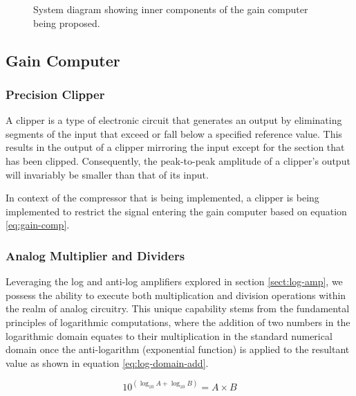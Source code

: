 \documentclass[10pt]{article}
\begin{document}
\begin{multicols*}{2}
\begin{figure}[!t]
{\begin{tikzpicture}
                    \end{tikzpicture}%
                }
        
                \caption{System diagram showing inner components of the gain computer being proposed.}
                \label{fig:gain-comp-diagram}
        
            \end{figure}

            \subsection{Gain Computer}               

                \subsubsection{Precision Clipper}
                    A clipper is a type of electronic circuit that generates an output by eliminating segments of the input that exceed or fall below a specified reference value. This results in the output of a clipper mirroring the input except for the section that has been clipped. Consequently, the peak-to-peak amplitude of a clipper's output will invariably be smaller than that of its input.\par
                    In context of the compressor that is being implemented, a clipper is being implemented to restrict the signal entering the gain computer based on equation \ref{eq:gain-comp}.

                \subsubsection{Analog Multiplier and Dividers} \label{sec:analog-mul-and-div}
                    Leveraging the log and anti-log amplifiers explored in section \ref{sect:log-amp}, we possess the ability to execute both multiplication and division operations within the realm of analog circuitry. This unique capability stems from the fundamental principles of logarithmic computations, where the addition of two numbers in the logarithmic domain equates to their multiplication in the standard numerical domain once the anti-logarithm (exponential function) is applied to the resultant value as shown in equation \ref{eq:log-domain-add}.
                    
                        \begin{equation} \label{eq:log-domain-add}
                            10^{(\log_{10}A+\log_{10}B)}=A\times B
                        \end{equation}
                    

\end{multicols*}
\end{document}
